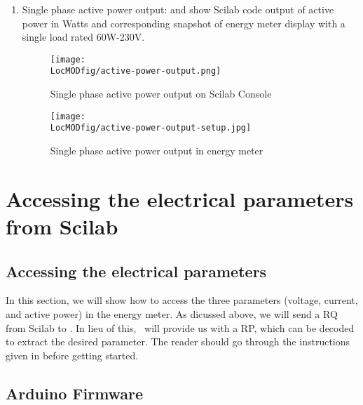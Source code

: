 \begin{enumerate}
  \item Single phase active power output:   and  show Scilab code output of active power  
  in Watts and corresponding snapshot of energy meter display with a
  single load rated 60W-230V.        
        \begin{figure}
          \centering
          \texttt{[image: \\LocMODfig/active-power-output.png]}
          \caption{Single phase active power output on Scilab Console}
          \label{fig:power-console}
        \end{figure}
        
        \begin{figure}
          \centering
          \texttt{[image: \\LocMODfig/active-power-output-setup.jpg]}
          \caption{Single phase active power output in energy meter}
          \label{fig:power-meter}
        \end{figure}
        
\end{enumerate}




\section{Accessing the electrical parameters from Scilab}
\subsection{Accessing the electrical parameters}
In this section, we will show how to access the three parameters (voltage, current, and active power)
in the energy meter. As dicussed above, we will send a RQ from Scilab to \arduino. In lieu of this, 
\arduino\ will provide us with a RP, which can be decoded to extract the 
desired parameter. The reader should go through the instructions given in
 before getting started. 

\subsection{Arduino Firmware}
\label{sec:firmware-modbus}

